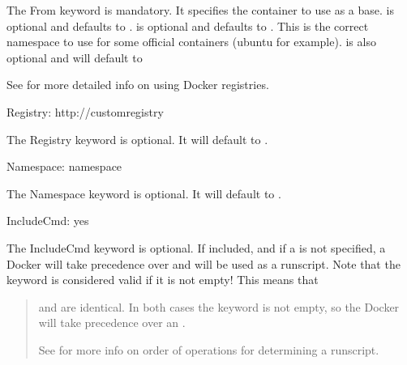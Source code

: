 \documentclass[letterpaper,10pt,english]{sphinxmanual}
\begin{document}
The From keyword is mandatory. It specifies the container to use as a base.  is optional and defaults to .
 is optional and defaults to . This is the correct namespace to use for some official containers (ubuntu for example).
 is also optional and will default to 

See {\hyperref[\detokenize{singularity_and_docker:singularity-and-docker}]{}} for more detailed info on using Docker registries.

%
\begin{sphinxVerbatim}[commandchars=\\\{\}]
Registry: http://custom\PYGZus{}registry
\end{sphinxVerbatim}

The Registry keyword is optional. It will default to .

%
\begin{sphinxVerbatim}[commandchars=\\\{\}]
Namespace: namespace
\end{sphinxVerbatim}

The Namespace keyword is optional. It will default to .

%
\begin{sphinxVerbatim}[commandchars=\\\{\}]
IncludeCmd: yes
\end{sphinxVerbatim}

The IncludeCmd keyword is optional. If included, and if a  is not specified, a Docker  will take precedence over 
and will be used as a runscript. Note that the  keyword is considered valid if it is not empty! This means that
\begin{quote}

 and  are identical. In both cases the  keyword is not empty, so the Docker  will take precedence
over an .

See {\hyperref[\detokenize{singularity_and_docker:singularity-and-docker}]{}} for more info on order of operations for determining a runscript.
\end{quote}
\end{document}
